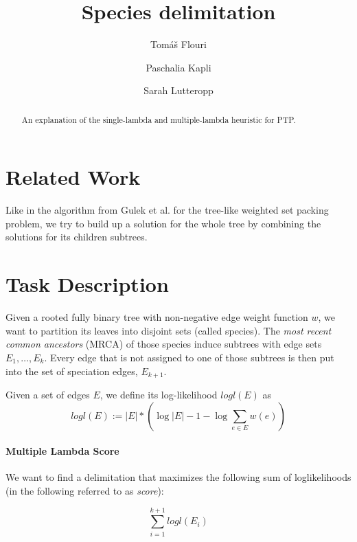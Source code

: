 \documentclass{llncs}
\begin{document}
\title{Species delimitation}


\author{Tom\'{a}\v{s} Flouri \and Paschalia Kapli \and Sarah Lutteropp}

\maketitle

\begin{abstract}
An explanation of the single-lambda and multiple-lambda heuristic for PTP.\@
\end{abstract}

\section{Related Work}

Like in the algorithm from Gulek et al.\cite{Gulek:2010:DPA:1838770.1839019} for the tree-like weighted set packing problem, we try to build up a solution for the whole tree by combining the solutions for its children subtrees.

\section{Task Description}

Given a rooted fully binary tree with non-negative edge weight function $w$, we want to partition its leaves into disjoint sets (called species). The \emph{most recent common ancestors} (MRCA) of those species induce subtrees with edge sets $E_1, \ldots, E_{k}$. Every edge that is not assigned to one of those subtrees is then put into the set of speciation edges, $E_{k+1}$.

Given a set of edges $E$, we define its log-likelihood $logl(E)$ as
$$logl(E) := |E| * (\log{|E|} - 1 - \log{\sum_{e \in E} w(e)})$$

\paragraph{Multiple Lambda Score}

We want to find a delimitation that maximizes the following sum of loglikelihoods (in the following referred to as \emph{score}):

$$\sum_{i=1}^{k+1}{logl(E_i)}$$
\end{document}
